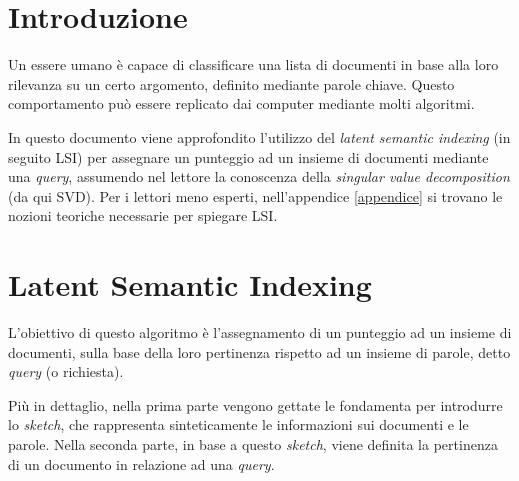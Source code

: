 \documentclass[12pt,a4paper]{article}
\theoremstyle{thm}
\theoremstyle{def}
\begin{document}

\tableofcontents
\newpage

							
\section{Introduzione}
Un essere umano è capace di classificare una lista di documenti in base alla loro rilevanza su un certo argomento, definito mediante parole chiave. Questo comportamento può essere replicato dai computer mediante molti algoritmi.

In questo documento viene approfondito l'utilizzo del {\it latent semantic indexing} (in seguito LSI) per assegnare un punteggio ad un insieme di documenti mediante una \textit{query}, assumendo nel lettore la conoscenza della \textit{singular value decomposition} (da qui SVD). Per i lettori meno esperti, nell'appendice \ref{appendice} si trovano le nozioni teoriche necessarie per spiegare LSI.


							
\section{Latent Semantic Indexing}
L'obiettivo di questo algoritmo è l'assegnamento di un punteggio ad un insieme di documenti, sulla base della loro pertinenza rispetto ad un insieme di parole, detto \textit{query} (o richiesta).

Più in dettaglio, nella prima parte vengono gettate le fondamenta per introdurre lo \textit{sketch}, che rappresenta sinteticamente le informazioni sui documenti e le parole. Nella seconda parte, in base a questo \textit{sketch}, viene definita la pertinenza di un documento in relazione ad una \textit{query}.

\end{document}
